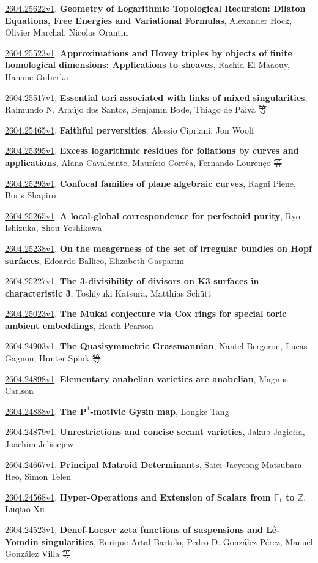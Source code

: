 \documentclass[9pt, a4paper]{article}
\theoremstyle{plain}
\theoremstyle{definition}
\theoremstyle{remark}
\newcommand{\arxiv}[3]{\href{https://arxiv.org/abs/#1}{#1}, \textbf{\textcolor{arxivblue}{#2}}, #3}
\begin{document}
\arxiv{2604.25622v1}{Geometry of Logarithmic Topological Recursion: Dilaton Equations, Free Energies and Variational Formulas}{Alexander Hock, Olivier Marchal, Nicolas Orantin}

\arxiv{2604.25523v1}{Approximations and Hovey triples by objects of finite homological dimensions: Applications to sheaves}{Rachid El Maaouy, Hanane Ouberka}

\arxiv{2604.25517v1}{Essential tori associated with links of mixed singularities}{Raimundo N. Araújo dos Santos, Benjamin Bode, Thiago de Paiva 等}

\arxiv{2604.25465v1}{Faithful perversities}{Alessio Cipriani, Jon Woolf}

\arxiv{2604.25395v1}{Excess logarithmic residues for foliations by curves and applications}{Alana Cavalcante, Maurício Corrêa, Fernando Lourenço 等}

\arxiv{2604.25293v1}{Confocal families of plane algebraic curves}{Ragni Piene, Boris Shapiro}

\arxiv{2604.25265v1}{A local-global correspondence for perfectoid purity}{Ryo Ishizuka, Shou Yoshikawa}

\arxiv{2604.25238v1}{On the meagerness of the set of irregular bundles on Hopf surfaces}{Edoardo Ballico, Elizabeth Gasparim}

\arxiv{2604.25227v1}{The 3-divisibility of divisors on K3 surfaces in characteristic 3}{Toshiyuki Katsura, Matthias Schütt}

\arxiv{2604.25023v1}{The Mukai conjecture via Cox rings for special toric ambient embeddings}{Heath Pearson}

\arxiv{2604.24903v1}{The Quasisymmetric Grassmannian}{Nantel Bergeron, Lucas Gagnon, Hunter Spink 等}

\arxiv{2604.24898v1}{Elementary anabelian varieties are anabelian}{Magnus Carlson}

\arxiv{2604.24888v1}{The $\mathbf{P}^1$-motivic Gysin map}{Longke Tang}

\arxiv{2604.24879v1}{Unrestrictions and concise secant varieties}{Jakub Jagiełła, Joachim Jelisiejew}

\arxiv{2604.24667v1}{Principal Matroid Determinants}{Saiei-Jaeyeong Matsubara-Heo, Simon Telen}

\arxiv{2604.24568v1}{Hyper-Operations and Extension of Scalars from $\mathbb{F}_1$ to $\mathbb{Z}$}{Luqiao Xu}

\arxiv{2604.24523v1}{Denef-Loeser zeta functions of suspensions and Lê-Yomdin singularities}{Enrique Artal Bartolo, Pedro D. González Pérez, Manuel González Villa 等}
\end{document}
